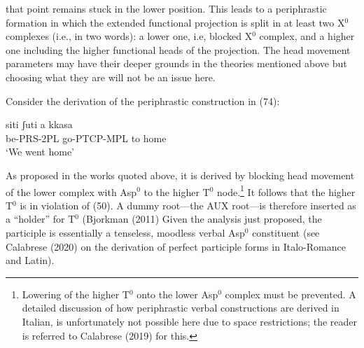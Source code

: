 \documentclass[output=paper,colorlinks,citecolor=brown,
]{langscibook}
\begin{document}
that point remains stuck in the lower position. This leads to a periphrastic formation in which the extended functional projection is split in at least two X$^0$ complexes (i.e., in two words): a lower one, i.e, blocked X$^0$ complex, and a higher one including the higher functional heads of the projection. The head movement parameters may have their deeper grounds in the theories mentioned above but choosing what they are will not be an issue here.
 
Consider the derivation of the periphrastic construction in (74):

\ea \gll siti    ʃuti        a   kkasa\\
   be-PRS-2PL  go-PTCP-MPL  to  home\\
   \glt ‘We went home’
\z

As proposed in the works quoted above, it is derived by blocking head movement of the lower complex with Asp$^0$ to the higher T$^0$ node.\footnote{  Lowering of the higher T$^0$ onto the lower Asp$^0$ complex must be prevented. A detailed discussion of how periphrastic verbal constructions are derived in Italian, is unfortunately not possible here due to space restrictions; the reader is referred to Calabrese (2019) for this.} It follows that the higher T$^0$ is in violation of (50).  A dummy root—the AUX root—is therefore inserted as a “holder” for T$^0$ (Bjorkman (2011) Given the analysis just proposed, the participle is essentially a tenseless, moodless verbal Asp$^0$ constituent (see Calabrese (2020) on the derivation of perfect participle forms in Italo-Romance and Latin).  
\end{document}
